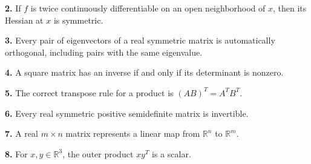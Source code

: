 \documentclass[11pt,a4paper]{article}
\begin{document}
\par\noindent\begin{minipage}{\linewidth}
\textbf{2.} If \(f\) is twice continuously differentiable on an open neighborhood of \(x\), then its Hessian at \(x\) is symmetric.
\end{minipage}\par\vspace{3mm}
\par\noindent\begin{minipage}{\linewidth}
\textbf{3.} Every pair of eigenvectors of a real symmetric matrix is automatically orthogonal, including pairs with the same eigenvalue.
\end{minipage}\par\vspace{3mm}
\par\noindent\begin{minipage}{\linewidth}
\textbf{4.} A square matrix has an inverse if and only if its determinant is nonzero.
\end{minipage}\par\vspace{3mm}
\par\noindent\begin{minipage}{\linewidth}
\textbf{5.} The correct transpose rule for a product is \((AB)^T=A^TB^T\).
\end{minipage}\par\vspace{3mm}
\par\noindent\begin{minipage}{\linewidth}
\textbf{6.} Every real symmetric positive semidefinite matrix is invertible.
\end{minipage}\par\vspace{3mm}
\par\noindent\begin{minipage}{\linewidth}
\textbf{7.} A real \(m\times n\) matrix represents a linear map from \(\mathbb R^n\) to \(\mathbb R^m\).
\end{minipage}\par\vspace{3mm}
\par\noindent\begin{minipage}{\linewidth}
\textbf{8.} For \(x,y\in\mathbb R^3\), the outer product \(xy^T\) is a scalar.
\end{minipage}\par\vspace{3mm}
\end{document}
